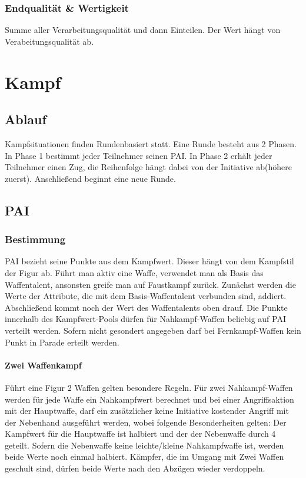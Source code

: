 \documentclass[a4paper,12pt,oneside]{book}
\begin{document}
\section{Endqualität \& Wertigkeit}
Summe aller Verarbeitungsqualität und dann Einteilen. Der Wert hängt von Verabeitungsqualität ab.


\part{Kampf}
\setcounter{chapter}{0}
\chapter{Ablauf}
Kampfsituationen finden Rundenbasiert statt. Eine Runde besteht aus 2 Phasen. 
In Phase 1 bestimmt jeder Teilnehmer seinen PAI. In Phase 2 erhält jeder Teilnehmer einen Zug, die Reihenfolge hängt dabei von der Initiative ab(höhere zuerst).
Anschließend beginnt eine neue Runde.

\chapter{PAI}

\section{Bestimmung}
PAI bezieht seine Punkte aus dem Kampfwert. Dieser hängt von dem Kampfstil der Figur ab. Führt man aktiv eine Waffe, verwendet man als Basis das Waffentalent, ansonsten greife man auf Faustkampf zurück. 
Zunächst werden die Werte der Attribute, die mit dem Basis-Waffentalent verbunden sind, addiert. Abschließend kommt noch der Wert des Waffentalents oben drauf. Die Punkte innerhalb des Kampfwert-Pools dürfen
für Nahkampf-Waffen beliebig auf PAI verteilt werden. Sofern nicht gesondert angegeben darf bei Fernkampf-Waffen kein Punkt in Parade erteilt werden.
\subsection{Zwei Waffenkampf}
Führt eine Figur 2 Waffen gelten besondere Regeln.
Für zwei Nahkampf-Waffen werden für jede Waffe ein Nahkampfwert berechnet und bei einer Angriffsaktion mit der Hauptwaffe, darf ein zusätzlicher keine Initiative kostender Angriff mit der Nebenhand ausgeführt werden, wobei folgende Besonderheiten gelten:
Der Kampfwert für die Hauptwaffe ist halbiert und der der Nebenwaffe durch 4 geteilt. Sofern die Nebenwaffe keine leichte/kleine Nahkampfwaffe ist, werden beide Werte noch einmal halbiert.
Kämpfer, die im Umgang mit Zwei Waffen geschult sind, dürfen beide Werte nach den Abzügen wieder verdoppeln.
\end{document}
